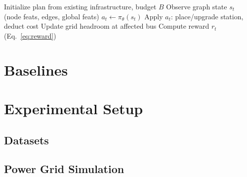 \documentclass[conference]{IEEEtran}
\begin{document}
\begin{algorithm}[t]
\caption{Grid-Aware Station Placement (Rollout)}
\label{alg:rollout}
\begin{algorithmic}[1]
\State Initialize plan from existing infrastructure, budget $B$
    \State Observe graph state $s_t$ (node feats, edges, global feats)
    \State $a_t \leftarrow \pi_\theta(s_t)$ 
    \State Apply $a_t$: place/upgrade station, deduct cost
    \State Update grid headroom at affected bus
    \State Compute reward $r_t$ (Eq.~\ref{eq:reward})
\EndWhile
\end{algorithmic}
\end{algorithm}

\section{Baselines}

\section{Experimental Setup}
\subsection{Datasets}

\subsection{Power Grid Simulation}
\end{document}
